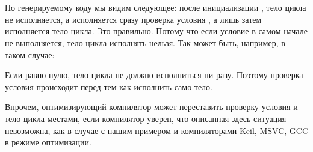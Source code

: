 ﻿\section{}





\subsection{}

По генерируемому коду мы видим следующее: после инициализации , тело цикла не исполняется, а исполняется сразу
проверка условия , а лишь затем исполняется тело цикла. Это правильно. Потому что если условие в самом начале
не выполняется, тело цикла исполнять нельзя. Так может быть, например, в таком случае:



Если  равно нулю, тело цикла не должно исполниться ни разу. Поэтому проверка
условия происходит перед тем как исполнить само тело.

Впрочем, оптимизирующий компилятор может переставить проверку условия и тело цикла местами, если компилятор уверен,
что описанная здесь ситуация невозможна, как в случае с нашим примером и компиляторами Keil, MSVC, GCC в режиме
оптимизации.
